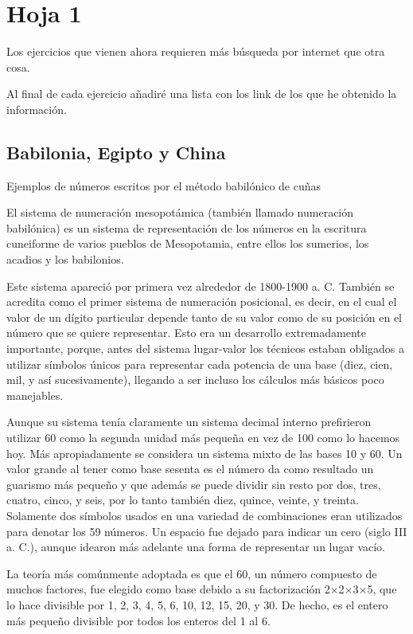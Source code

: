 \section{Hoja 1}

Los ejercicios que vienen ahora requieren más búsqueda por internet que otra cosa.

Al final de cada ejercicio añadiré una lista con los link de los que he obtenido la información.

\subsection{Babilonia, Egipto y China}
\begin{problem}[1]
Ejemplos de números escritos por el método babilónico de cuñas

\solution

El sistema de numeración mesopotámica (también llamado numeración babilónica) es un sistema de representación de los números en la escritura cuneiforme de varios pueblos de Mesopotamia, entre ellos los sumerios, los acadios y los babilonios.

Este sistema apareció por primera vez alrededor de 1800-1900  a. C. También se acredita como el primer sistema de numeración posicional, es decir, en el cual el valor de un dígito particular depende tanto de su valor como de su posición en el número que se quiere representar. Esto era un desarrollo extremadamente importante, porque, antes del sistema lugar-valor los técnicos estaban obligados a utilizar símbolos únicos para representar cada potencia de una base (diez, cien, mil, y así sucesivamente), llegando a ser incluso los cálculos más básicos poco manejables.

Aunque su sistema tenía claramente un sistema decimal interno prefirieron utilizar 60 como la segunda unidad más pequeña en vez de 100 como lo hacemos hoy. Más apropiadamente se considera un sistema mixto de las bases 10 y 60. Un valor grande al tener como base sesenta es el número da como resultado un guarismo más pequeño y que además se puede dividir sin resto por dos, tres, cuatro, cinco, y seis, por lo tanto también diez, quince, veinte, y treinta. Solamente dos símbolos usados en una variedad de combinaciones eran utilizados para denotar los 59 números. Un espacio fue dejado para indicar un cero (siglo III a. C.), aunque idearon más adelante una forma de representar un lugar vacío.

La teoría más comúnmente adoptada es que el 60, un número compuesto de muchos factores, fue elegido como base debido a su factorización 2×2×3×5, que lo hace divisible por 1, 2, 3, 4, 5, 6, 10, 12, 15, 20, y 30. De hecho, es el entero más pequeño divisible por todos los enteros del 1 al 6.


\end{problem}

